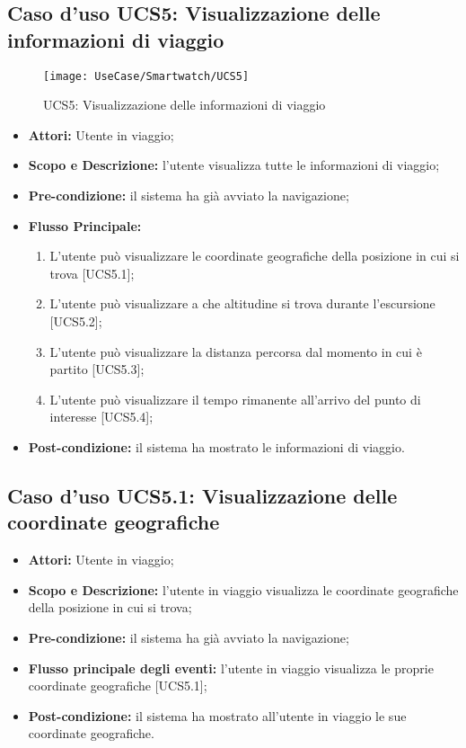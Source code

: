 \subsection{Caso d'uso UCS5: Visualizzazione delle informazioni di viaggio}
\begin{figure}[H]
\centering
\texttt{[image: UseCase/Smartwatch/UCS5]}
\caption{UCS5: Visualizzazione delle informazioni di viaggio}
\end{figure}
\begin{itemize}
\item \textbf{Attori:} Utente in viaggio;
\item \textbf{Scopo e Descrizione:} l'utente visualizza tutte le informazioni di viaggio;
\item \textbf{Pre-condizione:} il sistema ha già avviato la navigazione;
\item \textbf{Flusso Principale:} 
\begin{enumerate}
\item L'utente può visualizzare le coordinate geografiche della posizione in cui si trova [UCS5.1];
\item L'utente può visualizzare a che altitudine si trova durante l'escursione [UCS5.2];
\item L'utente può visualizzare la distanza percorsa dal momento in cui è partito [UCS5.3];
\item L'utente può visualizzare il tempo rimanente all'arrivo del punto di interesse [UCS5.4];
\end{enumerate}
\item \textbf{Post-condizione:} il sistema ha mostrato le informazioni di viaggio.
\end{itemize}

\subsection{Caso d'uso UCS5.1: Visualizzazione delle coordinate geografiche}
\begin{itemize}
\item \textbf{Attori:} Utente in viaggio;
\item \textbf{Scopo e Descrizione:} l'utente in viaggio visualizza le coordinate geografiche della posizione in cui si trova;
\item \textbf{Pre-condizione:} il sistema ha già avviato la navigazione;
\item \textbf{Flusso principale degli eventi:} l'utente in viaggio visualizza le proprie coordinate geografiche [UCS5.1];
\item \textbf{Post-condizione:} il sistema ha mostrato all'utente in viaggio le sue coordinate geografiche.
\end{itemize}

